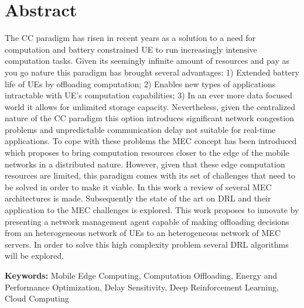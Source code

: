 \section*{Abstract}


\noindent The \acrfull{CC} paradigm has risen in recent years as a solution to a need for computation and battery constrained \acrfull{UE} to run increasingly intensive computation tasks. Given its seemingly infinite amount of resources and pay as you go nature this paradigm has brought several advantages: 1) Extended battery life of \acrfull{UE}s by offloading computation; 2) Enables new types of applications intractable with \acrfull{UE}'s computation capabilities; 3) In an ever more data focused world it allows for unlimited storage capacity. Nevertheless, given the centralized nature of the \acrshort{CC} paradigm this option introduces significant network congestion problems and unpredictable communication delay not suitable for real-time applications. To cope with these problems the \acrfull{MEC} concept has been introduced which proposes to bring computation resources closer to the edge of the mobile networks in a distributed nature. However, given that these edge computation resources are limited, this paradigm comes with its set of challenges that need to be solved in order to make it viable. In this work a review of several \acrshort{MEC} architectures is made. Subsequently the state of the art on \acrfull{DRL} and their application to the \acrshort{MEC} challenges is explored. This work proposes to innovate by presenting a network management agent capable of making offloading decisions from an heterogeneous network of \acrshort{UE}s to an  heterogeneous network of \acrshort{MEC} servers. In order to solve this high complexity problem several \acrshort{DRL} algorithms will be explored.

\vfill

\textbf{\Large Keywords:} Mobile Edge Computing, Computation Offloading, Energy and Performance Optimization, Delay Sensitivity, Deep Reinforcement Learning, Cloud Computing

